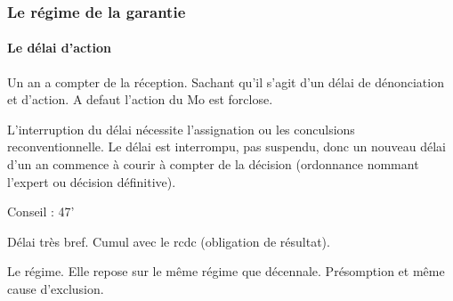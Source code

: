 			\subsubsection{Le régime de la garantie}

				\paragraph{Le délai d'action} Un an a compter de la réception. Sachant qu'il s'agit d'un délai de dénonciation et d'action. A defaut l'action du Mo est forclose.

				L'interruption du délai nécessite l'assignation ou les conculsions reconventionnelle. Le délai est interrompu, pas suspendu, donc un nouveau délai d'un an commence à courir à compter de la décision (ordonnance nommant l'expert ou décision définitive).

				Conseil : 47'

				Délai très bref. Cumul avec le rcdc (obligation de résultat).

				Le régime. Elle repose sur le même régime que décennale. Présomption et même cause d'exclusion.

